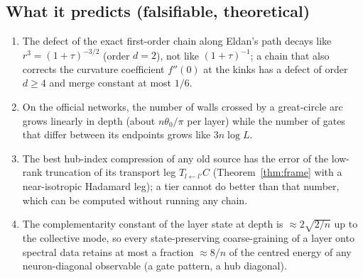 \subsection{What it predicts (falsifiable, theoretical)}
\begin{enumerate}[leftmargin=*]
\item The defect of the exact first-order chain along Eldan's path decays like $r^3=(1+\tau)^{-3/2}$ (order $d=2$),
not like $(1+\tau)^{-1}$; a chain that also corrects the curvature coefficient $f''(0)$ at the kinks has a defect of order
$d\ge4$ and merge constant at most $1/6$.
\item On the official networks, the number of walls crossed by a great-circle arc grows linearly in depth (about
$n\theta_0/\pi$ per layer) while the number of gates that differ between its endpoints grows like $3n\log L$.
\item The best hub-index compression of any old source has the error of the low-rank truncation of its transport leg
$T_{l\leftarrow l'}C$ (Theorem~\ref{thm:frame} with a near-isotropic Hadamard leg); a tier cannot do better than that number,
which can be computed without running any chain.
\item The complementarity constant of the layer state at depth is $\approx2\sqrt{2/n}$ up to the collective mode, so every
state-preserving coarse-graining of a layer onto spectral data retains at most a fraction $\approx8/n$ of the centred
energy of any neuron-diagonal observable (a gate pattern, a hub diagonal).
\end{enumerate}

